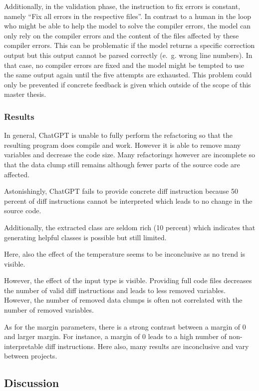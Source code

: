 Additionally, in the validation phase, the instruction to fix errors is constant, namely \enquote{Fix all errors in the respective files}. In contrast to a human in the loop who might be able to help the model to solve the compiler errors, the model can only rely on the compiler errors and the content of the files affected by these compiler errors. This can be problematic if the model returns a specific correction output but this output cannot be parsed correctly (e.~g. wrong line numbers). In that case, no compiler errors are fixed and the model might be tempted to use the same output again until the five attempts are exhausted. This problem could only be prevented if concrete feedback is given which outside of the scope of this master thesis. 

\subsubsection{Results}

In general, ChatGPT is unable to fully perform the refactoring so that the resulting program does compile and work. However it is able to remove many variables and decrease the code size. Many refactorings however are incomplete so that the data clump still remains although fewer parts of the source code are affected.

Astonishingly, ChatGPT fails to provide concrete diff instruction because 50 percent of  diff instructions cannot be interpreted which leads to no change in the source code. 

Additionally, the extracted class are seldom rich (10 percent) which indicates that generating helpful classes is possible but still limited. 

Here, also the effect of the temperature seems to be inconclusive as no trend is visible.

However, the effect of the input type is visible. Providing full code files decreases the number of valid diff instructions and leads to less removed variables. However, the number of removed data clumps is often not correlated with the number of removed variables.



As for the margin parameters, there is a strong contrast between a margin of 0 and larger margin. For instance, a margin of 0 leads to a high number of non-interpretable diff instructions. Here also, many results are inconclusive and vary between projects. 


\subsection{Discussion}

